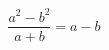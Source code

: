 \documentclass{article}
\begin{document}
\begin{equation}
\frac{a^2 - b^2}{a + b} = a - b
\end{equation}
\end{document}
